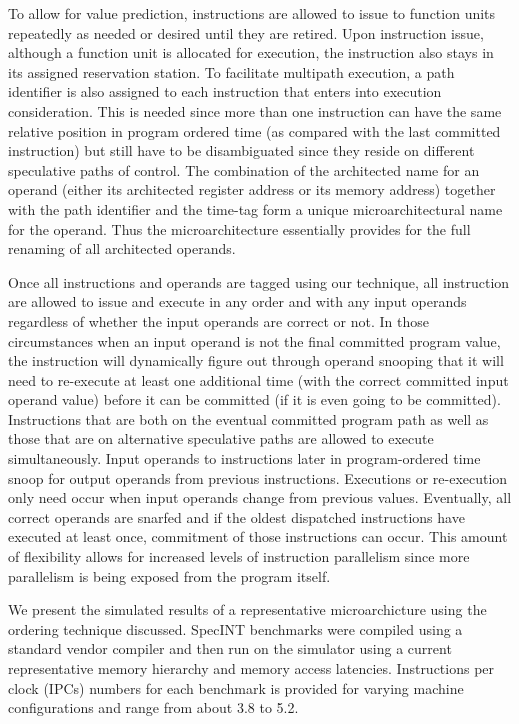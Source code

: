 \documentclass[10pt,dvips]{article}
\begin{document}
To allow for value prediction, instructions are allowed to
issue to function units repeatedly as needed or desired until they are
retired.  Upon instruction issue, although a function unit is
allocated for execution, the instruction also stays in its
assigned reservation station.
To facilitate multipath execution, a path identifier is also
assigned to each instruction that enters into execution
consideration.  This is needed since more than one
instruction can have the same relative position
in program ordered time (as compared with the last committed
instruction) but still have to be disambiguated since they reside on 
different speculative paths of control.
The combination of the architected name for an operand (either
its architected register address or its memory address) together
with the path identifier and the time-tag form a unique microarchitectural
name for the operand.  Thus the microarchitecture essentially provides
for the full renaming of all architected operands.

Once all instructions and operands are tagged using our technique,
all instruction are allowed to issue and execute in any order
and with any input operands regardless of whether the input operands
are correct or not.  In those circumstances when an input operand
is not the final committed program value, the instruction will
dynamically figure out through operand snooping that it will need
to re-execute at least one additional time (with the correct
committed input operand value) before it can be committed (if it is
even going to be committed).  Instructions that are both on
the eventual committed program path as well as those that are
on alternative speculative paths are allowed to execute simultaneously.
Input operands to instructions later in program-ordered time snoop
for output operands from previous instructions.
Executions or re-execution only need occur when input operands
change from previous values.
Eventually, all correct operands are snarfed and if the oldest
dispatched instructions have executed at least once, commitment of
those instructions can occur.
This amount of flexibility allows for increased levels of instruction
parallelism since more parallelism is being exposed from the
program itself.

We present the simulated results of a representative microarchicture
using the ordering technique discussed.
SpecINT benchmarks were compiled using a standard vendor compiler and
then run on the simulator using a current representative memory hierarchy
and memory access latencies.  Instructions per clock (IPCs) numbers for
each benchmark is provided for varying machine configurations and
range from about 3.8 to 5.2.
%
%
%
%
\end{document}
